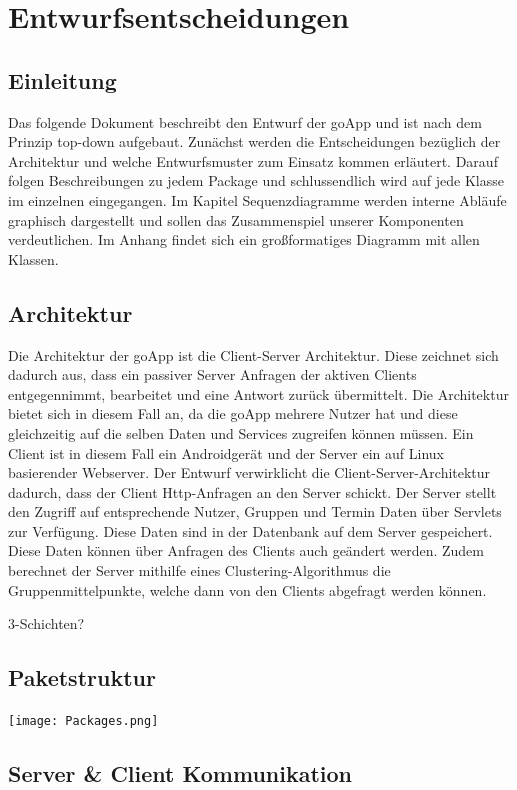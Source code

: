 

\section{Entwurfsentscheidungen}
	\subsection{Einleitung}
	Das folgende Dokument beschreibt den Entwurf der goApp und ist nach dem Prinzip top-down aufgebaut.
	Zunächst werden die Entscheidungen bezüglich der Architektur und welche Entwurfsmuster zum Einsatz kommen erläutert.
	Darauf folgen Beschreibungen zu jedem Package und schlussendlich wird auf jede Klasse im einzelnen eingegangen.
	Im Kapitel Sequenzdiagramme werden interne Abläufe graphisch dargestellt und sollen das Zusammenspiel unserer Komponenten verdeutlichen. 
	Im Anhang findet sich ein großformatiges Diagramm mit allen Klassen.
	\subsection{Architektur}
	Die Architektur der goApp ist die Client-Server Architektur. Diese zeichnet sich dadurch aus, dass ein passiver Server Anfragen der aktiven Clients entgegennimmt, bearbeitet und eine Antwort zurück übermittelt. Die Architektur bietet sich in diesem Fall an, da die goApp mehrere Nutzer hat und diese gleichzeitig auf die selben Daten und Services zugreifen können müssen. 
	Ein Client ist in diesem Fall ein Androidgerät und der Server ein auf Linux basierender Webserver.
	Der Entwurf verwirklicht die Client-Server-Architektur dadurch, dass der Client Http-Anfragen an den Server schickt. Der Server stellt den Zugriff auf entsprechende Nutzer, Gruppen und Termin Daten über Servlets zur Verfügung. Diese Daten sind in der Datenbank auf dem Server gespeichert. Diese Daten können über Anfragen des Clients auch geändert werden. Zudem berechnet der Server mithilfe eines Clustering-Algorithmus die Gruppenmittelpunkte, welche dann von den Clients abgefragt werden können.
	 
	3-Schichten?
	
	
	\subsection{Paketstruktur}
	 \texttt{[image: Packages.png]}

	\subsection{Server \& Client Kommunikation}

